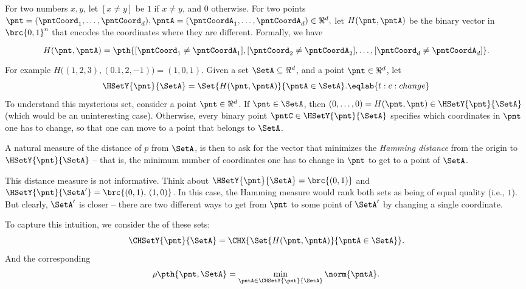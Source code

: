 For two numbers $x,y$, let $[x\neq y]$ be $1$ if $x \neq y$, and $0$
otherwise.  For two points
\begin{math}
    \pnt = (\pntCoord_1, \ldots, \pntCoord_d),%
    \pntA = (\pntCoordA_1, \ldots, \pntCoordA_d) \in \Re^d,
\end{math}
let $H(\pnt,\pntA)$ be the binary vector in $\brc{0,1}^n$ that encodes
the coordinates where they are different. Formally, we have
\begin{equation}
  H(\pnt,\pntA)%
  =%
  \pth{\Bigl. [\pntCoord_1 \neq \pntCoordA_1],
  [\pntCoord_2 \neq \pntCoordA_2], \ldots,
  [\pntCoord_d \neq \pntCoordA_d]}.
\end{equation}
For example $H\bigl( (1,2,3), (0.1,2,-1) \bigr) = (1,0,1)$.  Given a
set $\SetA \subseteq \Re^d$, and a point $\pnt \in \Re^d$, let
\begin{equation}
    \HSetY{\pnt}{\SetA} = \Set{H(\pnt,\pntA)}{\pntA \in \SetA}.%
    \eqlab{t:c:change}%
\end{equation}
To understand this mysterious set, consider a point $\pnt \in \Re^d$.
If $\pnt \in \SetA$, then
$(0, \ldots, 0) = H(\pnt,\pnt) \in \HSetY{\pnt}{\SetA}$ (which would
be an uninteresting case). Otherwise, every binary point
$\pntC \in \HSetY{\pnt}{\SetA} $ specifies which coordinates in $\pnt$
one has to change, so that one can move to a point that belongs to
$\SetA$.

A natural measure of the distance of $p$ from $\SetA$, is then to ask
for the vector that minimizes the \emph{Hamming distance} from the
origin to $\HSetY{\pnt}{\SetA}$ -- that is, the minimum number of
coordinates one has to change in $\pnt$ to get to a point of
$\SetA$.

This distance measure is not informative. Think about
$\HSetY{\pnt}{\SetA} = \brc{(0,1) }$ and
$\HSetY{\pnt}{\SetA'}= \brc{(0,1), \, (1,0)}$. In this case, the
Hamming measure would rank both sets as being of equal quality (i.e.,
$1$). But clearly, $\SetA'$ is closer -- there are two different ways
to get from $\pnt$ to some point of $\SetA'$ by changing a single
coordinate.

To capture this intuition, we consider the  of
these sets:
\begin{align*}
  \CHSetY{\pnt}{\SetA} = \CHX{ \bigl.\Set{H(\pnt,\pntA)}{\pntA \in \SetA}}.
\end{align*}
\newcommand{\distTY}[2]{\rho\pth{#1, #2}}%
\newcommand{\distTSqY}[2]{\rho^2\pth{#1, #2}}%
And the corresponding 
\begin{equation}
    \distTY{\pnt}{\SetA} = \min_{\pntA \in \CHSetY{\pnt}{\SetA}}
    \norm{\pntA}.
\end{equation}

